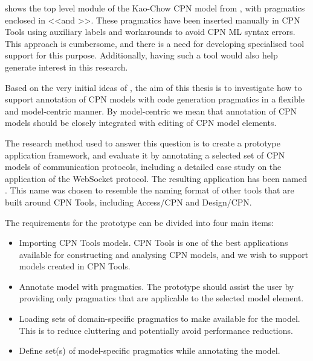  shows the top level module of the Kao-Chow CPN model from
\cite{Simonsen2011}, with pragmatics enclosed in \textless\textless and
\textgreater\textgreater. These pragmatics have been inserted manually in CPN
Tools using auxiliary labels and workarounds to avoid CPN ML syntax errors.
This approach is cumbersome, and there is a need for developing specialised tool
support for this purpose. Additionally, having such a tool would also help
generate interest in this research.

Based on the very initial ideas of \cite{Simonsen2011}, the aim of this thesis
is to investigate how to support annotation of CPN models with code generation
pragmatics in a flexible and model-centric manner. By model-centric we mean that
annotation of CPN models should be closely integrated with editing of CPN model
elements.

The research method used to answer this question is to create a prototype
application framework, and evaluate it by annotating a selected set of CPN
models of communication protocols, including a detailed case study on the
application of the WebSocket protocol. The resulting application has been named
\thename{}. This name was chosen to resemble the naming format of other tools that
are built around CPN Tools, including Access/CPN and Design/CPN.

The requirements for the prototype can be divided into four main items:

\begin{itemize} 
	\item Importing CPN Tools models. CPN Tools is one of the best applications
	available for constructing and analysing CPN models, and we wish to
	support models created in CPN Tools.

	\item Annotate model with pragmatics. The prototype should assist the user by
	providing only pragmatics that are applicable to the selected model element.
		
	\item Loading sets of domain-specific pragmatics to make available for the
	model. This is to reduce cluttering and potentially avoid performance
	reductions.
	
	\item Define set(s) of model-specific pragmatics while annotating the model. 

\end{itemize}

